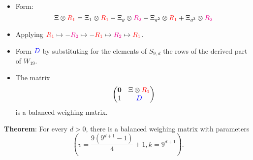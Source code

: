 \documentclass{beamer}
\newcommand{\rred}[1]{\textcolor{red}{#1}}
\newcommand{\bblue}[1]{\textcolor{blue}{#1}}
\newcommand{\mmag}[1]{\textcolor{magenta}{#1}}
\begin{document}
  

\begin{frame}

  \begin{itemize}
  \item Form:
    \[
      \Xi \otimes \rred{R_1} = \Xi_1 \otimes \rred{R_1} - \Xi_g \otimes
      \mmag{R_2} - \Xi_{g^2} \otimes \rred{R_1} + \Xi_{g^3} \otimes \mmag{R_2}
    \]
  \item Applying $\rred{R_1} \mapsto -\mmag{R_2} \mapsto -\rred{R_1} \mapsto
    \mmag{R_2} \mapsto \rred{R_1}$.
  \item Form $\bblue{D}$ by substituting for the elements of $S_{9,d}$ the rows
    of the derived part of $W_{19}$.
  \end{itemize}
  
\end{frame}

\begin{frame}

  \begin{itemize}
  \item The matrix
    \[
      \begin{pmatrix}
        \textbf{0} & \Xi \otimes \rred{R_1} \\
        \text{1} & \bblue{D}
      \end{pmatrix}
    \]
    is a balanced weighing matrix.
  \end{itemize}

  \begin{block}{{\bf Theorem}: \cite[][]{new-bw}}
    For every $d>0$, there is a balanced weighing matrix with parameters
    \[
      \left(
        v = \frac{9(9^{d+1}-1)}{4} + 1, k = 9^{d+1}
      \right).
    \]
  \end{block}

\end{frame}
\end{document}
